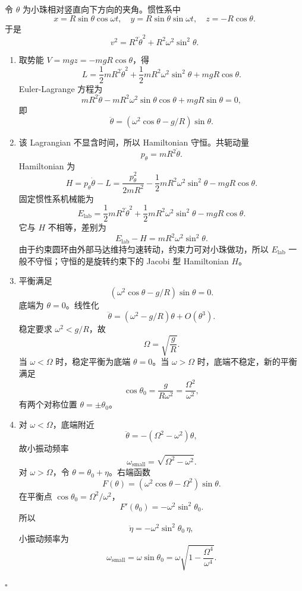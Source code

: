 \documentclass[UTF8,12pt]{ctexart}
\newenvironment{solution}{%
  \par\medskip
  \noindent{\bfseries 解答}\quad\ignorespaces
}{\hfill$\square$\par\medskip}
\begin{document}
\begin{solution}
令 \(\theta\) 为小珠相对竖直向下方向的夹角。惯性系中
\[
x=R\sin\theta\cos\omega t,\quad
y=R\sin\theta\sin\omega t,\quad
z=-R\cos\theta.
\]
于是
\[
v^2=R^2\dot\theta^2+R^2\omega^2\sin^2\theta.
\]
\begin{enumerate}[label=(\arabic*)]
\item 取势能 \(V=mgz=-mgR\cos\theta\)，得
\[
L=\frac12mR^2\dot\theta^2+\frac12mR^2\omega^2\sin^2\theta+mgR\cos\theta.
\]
Euler-Lagrange 方程为
\[
mR^2\ddot\theta
-mR^2\omega^2\sin\theta\cos\theta+mgR\sin\theta=0,
\]
即
\[
\ddot\theta=(\omega^2\cos\theta-g/R)\sin\theta.
\]

\item 该 Lagrangian 不显含时间，所以 Hamiltonian 守恒。共轭动量
\[
p_\theta=mR^2\dot\theta.
\]
Hamiltonian 为
\[
H=p_\theta\dot\theta-L
=\frac{p_\theta^2}{2mR^2}
-\frac12mR^2\omega^2\sin^2\theta-mgR\cos\theta.
\]
固定惯性系机械能为
\[
E_{\mathrm{lab}}
=\frac12mR^2\dot\theta^2
+\frac12mR^2\omega^2\sin^2\theta
-mgR\cos\theta.
\]
它与 \(H\) 不相等，差别为
\[
E_{\mathrm{lab}}-H=mR^2\omega^2\sin^2\theta.
\]
由于约束圆环由外部马达维持匀速转动，约束力可对小珠做功，所以 \(E_{\mathrm{lab}}\) 一般不守恒；守恒的是旋转约束下的 Jacobi 型 Hamiltonian \(H\)。

\item 平衡满足
\[
(\omega^2\cos\theta-g/R)\sin\theta=0.
\]
底端为 \(\theta=0\)。线性化
\[
\ddot\theta=(\omega^2-g/R)\theta+O(\theta^3).
\]
稳定要求 \(\omega^2<g/R\)，故
\[
\Omega=\sqrt{\frac gR}.
\]
当 \(\omega<\Omega\) 时，稳定平衡为底端 \(\theta=0\)。当 \(\omega>\Omega\) 时，底端不稳定，新的平衡满足
\[
\cos\theta_0=\frac{g}{R\omega^2}=\frac{\Omega^2}{\omega^2},
\]
有两个对称位置 \(\theta=\pm\theta_0\)。

\item 对 \(\omega<\Omega\)，底端附近
\[
\ddot\theta=-(\Omega^2-\omega^2)\theta,
\]
故小振动频率
\[
\omega_{\mathrm{small}}=\sqrt{\Omega^2-\omega^2}.
\]
对 \(\omega>\Omega\)，令 \(\theta=\theta_0+\eta\)。右端函数
\[
F(\theta)=(\omega^2\cos\theta-\Omega^2)\sin\theta.
\]
在平衡点 \(\cos\theta_0=\Omega^2/\omega^2\)，
\[
F'(\theta_0)
=-\omega^2\sin^2\theta_0.
\]
所以
\[
\ddot\eta=-\omega^2\sin^2\theta_0\,\eta,
\]
小振动频率为
\[
\omega_{\mathrm{small}}
=\omega\sin\theta_0
=\omega\sqrt{1-\frac{\Omega^4}{\omega^4}}.
\]
\end{enumerate}
\end{solution}
\end{document}

